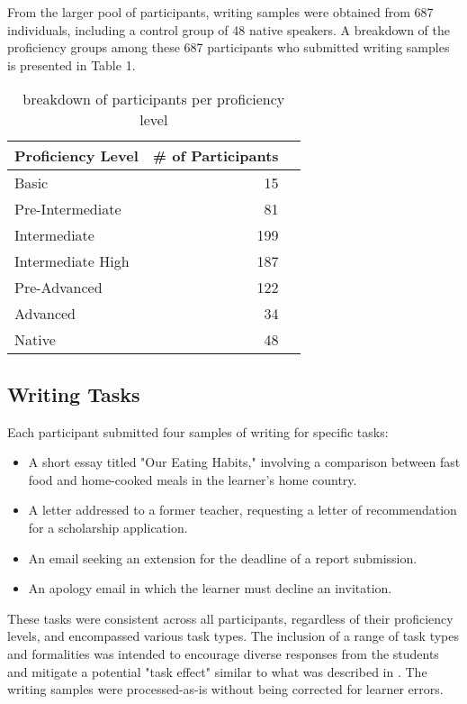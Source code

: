 From the larger pool of participants, writing samples were obtained from 687 individuals, including a control group of 48 native speakers. A breakdown of the proficiency groups among these 687 participants who submitted writing samples is presented in Table 1.

\begin{table}
\centering
\begin{tabular}{lrl}
\hline \textbf{Proficiency Level} & \textbf{\# of Participants} \\ \hline
Basic & 15 \\
Pre-Intermediate & 81 \\
Intermediate & 199\\
Intermediate High & 187 \\
Pre-Advanced & 122 \\
Advanced & 34\\
Native & 48 \\
\hline
\end{tabular}
\caption{\label{font-table} breakdown of participants per proficiency level}
\end{table}

\subsection{Writing Tasks}
Each participant submitted four samples of writing for specific tasks:
\begin{itemize}
    \item A short essay titled "Our Eating Habits," involving a comparison between fast food and home-cooked meals in the learner's home country.
    \item A letter addressed to a former teacher, requesting a letter of recommendation for a scholarship application.
    \item An email seeking an extension for the deadline of a report submission.
    \item An apology email in which the learner must decline an invitation.
\end{itemize}
These tasks were consistent across all participants, regardless of their proficiency levels, and encompassed various task types. The inclusion of a range of task types and formalities was intended to encourage diverse responses from the students and mitigate a potential "task effect" similar to what  was described in \cite{Alexpoulou2017}. The writing samples were processed-as-is without being corrected for learner errors.

